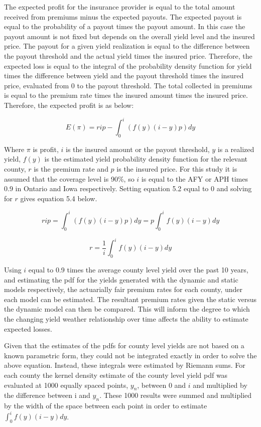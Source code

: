 The expected profit for the insurance provider is equal to the total amount received from premiums minus the expected payouts. The expected payout is equal to the probability of a payout times the payout amount. In this case the payout amount is not fixed but depends on the overall yield level and the insured price. The payout for a given yield realization is equal to the difference between the payout threshold and the actual yield times the insured price. Therefore, the expected loss is equal to the integral of the probability density function for yield times the difference between yield and the payout threshold times the insured price, evaluated from 0 to the payout threshold. The total collected in premiums is equal to the premium rate times the insured amount times the insured price. Therefore, the expected profit is as below:

\begin{equation}
    E(\pi)=rip-\int_{0}^{i}(f(y)(i-y)p)dy
\end{equation}

Where $\pi$ is profit, $i$ is the insured amount or the payout threshold, $y$ is a realized yield, $f(y)$ is the estimated yield probability density function for the relevant county, $r$ is the premium rate and $p$ is the insured price. For this study it is assumed that the coverage level is 90\%, so $i$ is equal to the AFY or APH times 0.9 in Ontario and Iowa respectively. Setting equation 5.2 equal to 0 and solving for $r$ gives equation 5.4 below.

\begin{equation}
    rip=\int_{0}^{i}(f(y)(i-y)p)dy=p\int_{0}^{i}f(y)(i-y)dy
 \end{equation}   
 
  \begin{equation}
    r=\frac{1}{i}\int_{0}^{i}f(y)(i-y)dy
\end{equation}

Using $i$ equal to 0.9 times the average county level yield over the past 10 years, and estimating the pdf for the yields generated with the dynamic and static models respectively, the actuarially fair premium rates for each county, under each model can be estimated. The resultant premium rates given the static versus the dynamic model can then be compared. This will inform the degree to which the changing yield weather relationship over time affects the ability to estimate expected losses.

Given that the estimates of the pdfs for county level yields are not based on a known parametric form, they could not be integrated exactly in order to solve the above equation. Instead, these integrals were estimated by Riemann sums. For each county the kernel density estimate of the county level yield pdf was evaluated at 1000 equally spaced points, $y_n$, between 0 and $i$ and multiplied by the difference between i and $y_n$. These 1000 results were summed and multiplied by the width of the space between each point in order to estimate $\int_{0}^{i}f(y)(i-y)dy$.


